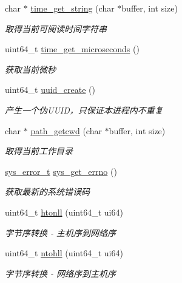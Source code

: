\begin{DoxyCompactItemize}
char $\ast$ \hyperlink{a00081_a6d3f7fda67a3c61f767f7b2dbfcbe4ee_a6d3f7fda67a3c61f767f7b2dbfcbe4ee}{time\+\_\+get\+\_\+string} (char $\ast$buffer, int size)
\begin{DoxyCompactList}\small\item\em 取得当前可阅读时间字符串 \end{DoxyCompactList}\item 
uint64\+\_\+t \hyperlink{a00081_a5eb6de730bc28be3fbc402b9841c1819_a5eb6de730bc28be3fbc402b9841c1819}{time\+\_\+get\+\_\+microseconds} ()
\begin{DoxyCompactList}\small\item\em 获取当前微秒 \end{DoxyCompactList}\item 
uint64\+\_\+t \hyperlink{a00081_a2b1df51bc127460a3bf25949068bfe92_a2b1df51bc127460a3bf25949068bfe92}{uuid\+\_\+create} ()
\begin{DoxyCompactList}\small\item\em 产生一个伪\+U\+U\+I\+D，只保证本进程内不重复 \end{DoxyCompactList}\item 
char $\ast$ \hyperlink{a00081_a6c98a04f00772c05a1f51afc185f7513_a6c98a04f00772c05a1f51afc185f7513}{path\+\_\+getcwd} (char $\ast$buffer, int size)
\begin{DoxyCompactList}\small\item\em 取得当前工作目录 \end{DoxyCompactList}\item 
\hyperlink{a00050_aeaea39e7ef5adeec1efaee3eee6b12ff_aeaea39e7ef5adeec1efaee3eee6b12ff}{sys\+\_\+error\+\_\+t} \hyperlink{a00081_a2e3ede072c59452900afcb1334611dac_a2e3ede072c59452900afcb1334611dac}{sys\+\_\+get\+\_\+errno} ()
\begin{DoxyCompactList}\small\item\em 获取最新的系统错误码 \end{DoxyCompactList}\item 
uint64\+\_\+t \hyperlink{a00081_ab1f59aa518d342661072356abbbb5e85_ab1f59aa518d342661072356abbbb5e85}{htonll} (uint64\+\_\+t ui64)
\begin{DoxyCompactList}\small\item\em 字节序转换 -\/ 主机序到网络序 \end{DoxyCompactList}\item 
uint64\+\_\+t \hyperlink{a00081_aebdeac120dd80e9450e54e6f18151f45_aebdeac120dd80e9450e54e6f18151f45}{ntohll} (uint64\+\_\+t ui64)
\begin{DoxyCompactList}\small\item\em 字节序转换 -\/ 网络序到主机序 \end{DoxyCompactList}\item 

\end{DoxyCompactItemize}
